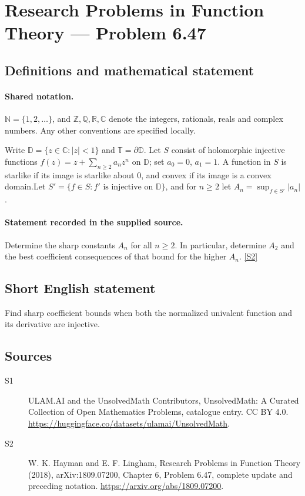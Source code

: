 \documentclass[11pt]{article}
\newcommand{\sref}[2]{\hyperlink{source:#1:#2}{[S#2]}}
\begin{document}
\section{Research Problems in Function Theory — Problem 6.47}\label{statement}

\subsection{Definitions and mathematical statement}

\paragraph{Shared notation.}$\mathbb N=\{1,2,\ldots\}$, and $\mathbb Z,\mathbb Q,\mathbb R,\mathbb C$ denote the integers, rationals, reals and complex numbers. Any other conventions are specified locally.


Write $\mathbb D=\{z\in\mathbb C:|z|<1\}$ and $\mathbb T=\partial\mathbb D$. Let $S$ consist of holomorphic injective functions $f(z)=z+\sum_{n\ge2}a_nz^n$ on $\mathbb D$; set $a_0=0$, $a_1=1$. A function in $S$ is starlike if its image is starlike about $0$, and convex if its image is a convex domain.Let $S'=\{f\in S:f'\text{ is injective on }\mathbb D\}$, and for $n\ge2$ let $A_n=\sup_{f\in S'}|a_n|$.
\paragraph{Statement recorded in the supplied source.}
Determine the sharp constants $A_n$ for all $n\ge2$. In particular, determine $A_2$ and the best coefficient consequences of that bound for the higher $A_n$. \sref{statement}{2}
\subsection{Short English statement}
Find sharp coefficient bounds when both the normalized univalent function and its derivative are injective.
\subsection{Sources}
\begin{description}
\item[\hypertarget{source:statement:1}{S1}] ULAM.AI and the UnsolvedMath Contributors, UnsolvedMath: A Curated Collection of Open Mathematics Problems, catalogue entry. CC BY 4.0. \url{https://huggingface.co/datasets/ulamai/UnsolvedMath}.
\item[\hypertarget{source:statement:2}{S2}] W. K. Hayman and E. F. Lingham, Research Problems in Function Theory (2018), arXiv:1809.07200, Chapter 6, Problem 6.47, complete update and preceding notation. \url{https://arxiv.org/abs/1809.07200}.
\end{description}
\label{end:statement}
\end{document}
